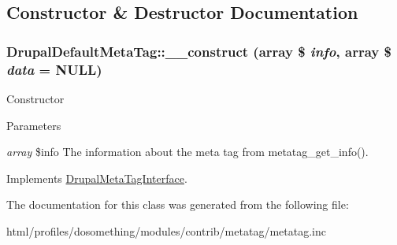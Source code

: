 \subsection{Constructor \& Destructor Documentation}
\hypertarget{classDrupalDefaultMetaTag_a3d6469bf551465d3925212cfad789597}{
\subsubsection[{\_\-\_\-construct}]{\setlength{\rightskip}{0pt plus 5cm}DrupalDefaultMetaTag::\_\-\_\-construct (array \$ {\em info}, \/  array \$ {\em data} = {\ttfamily NULL})}}
\label{classDrupalDefaultMetaTag_a3d6469bf551465d3925212cfad789597}
Constructor


\begin{DoxyParams}{Parameters}
\item[{\em array}]\$info The information about the meta tag from metatag\_\-get\_\-info(). \end{DoxyParams}


Implements \hyperlink{interfaceDrupalMetaTagInterface_a21e8f7f5fb413a733c967249da89e8e3}{DrupalMetaTagInterface}.

The documentation for this class was generated from the following file:\begin{DoxyCompactItemize}
\item 
html/profiles/dosomething/modules/contrib/metatag/metatag.inc\end{DoxyCompactItemize}
